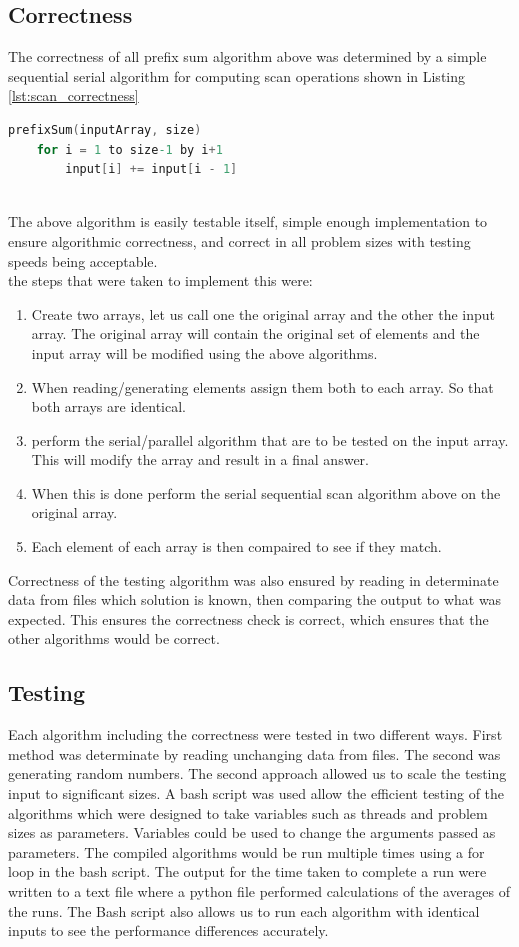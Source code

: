 \subsection{Correctness}
The correctness of all prefix sum algorithm above was determined by a simple sequential serial algorithm for computing scan operations shown in Listing \ref{lst:scan_correctness}
\begin{lstlisting}[language=C, caption={Serial Sequenctial Scan Algorithm with + operator}, label={lst:scan_correctness}]
prefixSum(inputArray, size) 
	for i = 1 to size-1 by i+1 
		input[i] += input[i - 1] 
	 
\end{lstlisting}
The above algorithm is easily testable itself, simple enough implementation to ensure algorithmic correctness, and correct in all problem sizes with testing speeds being acceptable. 
\\the steps that were taken to implement this were:
\begin{enumerate}
	\item Create two arrays, let us call one the original array and the other the input array. The original array will contain the original set of elements and the input array will be modified using the above algorithms. 
	\item When reading/generating elements assign them both to each array. So that both arrays are identical.
	\item perform the serial/parallel algorithm that are to be tested on the input array. This will modify the array and result in a final answer.
	\item When this is done perform the serial sequential scan algorithm above on the original array.
	\item Each element of each array is then compaired to see if they match.
	
\end{enumerate}
Correctness of the testing algorithm was also ensured by reading in determinate data from files which solution is known, then comparing the output to what was expected. This ensures the correctness check is correct, which ensures that the other algorithms would be correct.
\subsection{Testing}
Each algorithm including the correctness were tested in two different ways. First method was determinate by reading unchanging data from files. The second was generating random numbers. The second approach allowed us to scale the testing input to significant sizes. A bash script was used allow the efficient testing of the algorithms which were designed to take variables such as threads and problem sizes as parameters. Variables could be used to change the arguments passed as parameters. The compiled algorithms would be run multiple times using a for loop in the bash script. The output for the time taken to complete a run were written to a text file where a python file performed calculations of the averages of the runs. 
The Bash script also allows us to run each algorithm with identical inputs to see the performance differences accurately.
